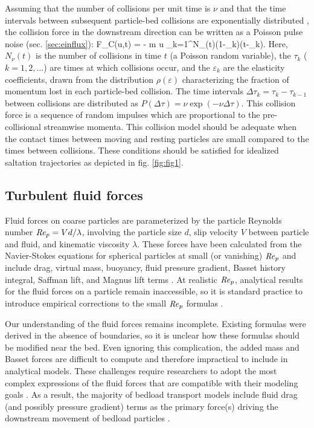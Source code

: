 Assuming that the number of collisions per unit time is $\nu$ and that the time intervals between subsequent particle-bed collisions are exponentially distributed \citep[e.g.][]{Gordon1972}, the collision force in the downstream direction can be written as a Poisson pulse noise (sec. \ref{sec:einflux}):
\be F_C(u,t) = - m u \sum_{k=1}^{N_\nu(t)}(1-\varepsilon_k)\delta(t-\tau_k). \label{eq:col} \ee
Here, $N_\nu(t)$ is the number of collisions in time $t$ (a Poisson random variable), the $\tau_k$ ($k=1,2,\dots$) are times at which collisions occur, and the $\varepsilon_k$ are the elasticity coefficients, drawn from the distribution $\rho(\varepsilon)$ characterizing the fraction of momentum lost in each particle-bed collision.
The time intervals $\Delta \tau_k = \tau_k-\tau_{k-1}$ between collisions are distributed as $P(\Delta \tau) = \nu \exp(-\nu\Delta \tau).$
This collision force is a sequence of random impulses which are proportional to the pre-collisional streamwise momenta. This collision model should be adequate when the contact times between moving and resting particles are small compared to the times between collisions. These conditions should be satisfied for idealized saltation trajectories as depicted in fig. \ref{fig:fig1}.

\subsection{Turbulent fluid forces}

Fluid forces on coarse particles are parameterized by the particle Reynolds number $\mbox{\textit{Re}}_p = V d/\lambda$, involving the particle size $d$, slip velocity $V$ between particle and fluid, and kinematic viscosity $\lambda$.
These forces have been calculated from the Navier-Stokes equations for spherical particles at small (or vanishing) $\mbox{\textit{Re}}_p$ and include drag, virtual mass, buoyancy, fluid pressure gradient, Basset history integral, Saffman lift, and Magnus lift terms \citep{Hjelmfelt1966, Maxey1983, Auton1987}.
At realistic $\mbox{\textit{Re}}_p$, analytical results for the fluid forces on a particle remain inaccessible, so it is standard practice to introduce empirical corrections to the small $\mbox{\textit{Re}}_p$ formulas \citep[e.g.][]{Clift1978,Schmeeckle2007}.

Our understanding of the fluid forces remains incomplete.
Existing formulas were derived in the absence of boundaries, so it is unclear how these formulas should be modified near the bed.
Even ignoring this complication, the added mass and Basset forces are difficult to compute and therefore impractical to include in analytical models.
These challenges require researchers to adopt the most complex expressions of the fluid forces that are compatible with their modeling goals \citep[e.g.][]{Michalades1997,Armenio2001}.
As a result, the majority of bedload transport models include fluid drag (and possibly pressure gradient) terms as the primary force(s) driving the downstream movement of bedload particles \citep{Ancey2014,Fan2014,Schmeeckle2014,Gonzalez2017,Elghannay2017}.

